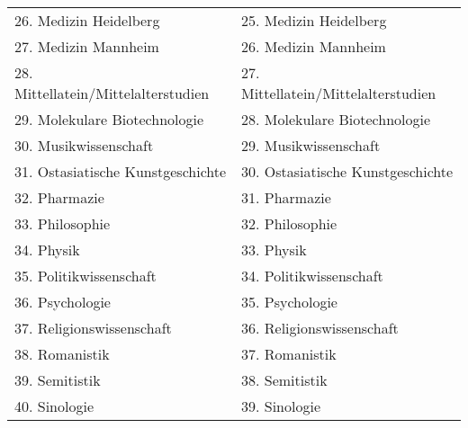 {\begin{longtable}{|p{7.5cm}|p{7.5cm}|}
        26. Medizin Heidelberg                                           & 25. Medizin Heidelberg                                           \\
        27. Medizin Mannheim                                             & 26. Medizin Mannheim                                             \\
        28. Mittellatein/Mittelalterstudien                              & 27. Mittellatein/Mittelalterstudien                              \\
        29. Molekulare Biotechnologie                                    & 28. Molekulare Biotechnologie                                    \\
        30. Musikwissenschaft                                            & 29. Musikwissenschaft                                            \\
        31. Ostasiatische Kunstgeschichte                                & 30. Ostasiatische Kunstgeschichte                                \\
        32. Pharmazie                                                    & 31. Pharmazie                                                    \\
        33. Philosophie                                                  & 32. Philosophie                                                  \\
        34. Physik                                                       & 33. Physik                                                       \\
        35. Politikwissenschaft                                          & 34. Politikwissenschaft                                          \\
        36. Psychologie                                                  & 35. Psychologie                                                  \\
        37. Religionswissenschaft                                        & 36. Religionswissenschaft                                        \\
        38. Romanistik                                                   & 37. Romanistik                                                   \\
        39. Semitistik                                                   & 38. Semitistik                                                   \\
        40. Sinologie                                                    & 39. Sinologie                                                    \\

\end{longtable}}
